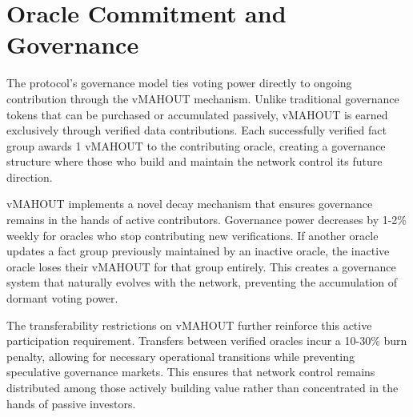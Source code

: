 \section{Oracle Commitment and Governance}

The protocol's governance model ties voting power directly to ongoing contribution through the vMAHOUT mechanism. Unlike traditional governance tokens that can be purchased or accumulated passively, vMAHOUT is earned exclusively through verified data contributions. Each successfully verified fact group awards 1 vMAHOUT to the contributing oracle, creating a governance structure where those who build and maintain the network control its future direction.

vMAHOUT implements a novel decay mechanism that ensures governance remains in the hands of active contributors. Governance power decreases by 1-2\% weekly for oracles who stop contributing new verifications. If another oracle updates a fact group previously maintained by an inactive oracle, the inactive oracle loses their vMAHOUT for that group entirely. This creates a governance system that naturally evolves with the network, preventing the accumulation of dormant voting power.

The transferability restrictions on vMAHOUT further reinforce this active participation requirement. Transfers between verified oracles incur a 10-30\% burn penalty, allowing for necessary operational transitions while preventing speculative governance markets. This ensures that network control remains distributed among those actively building value rather than concentrated in the hands of passive investors.

